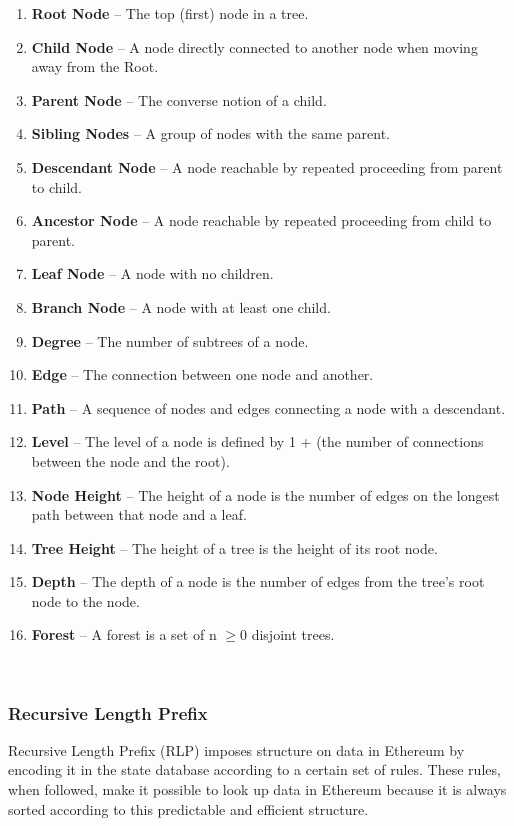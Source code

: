 \documentclass[10pt,a4paper,leqno,bibliography=totoc]{scrartcl}
\newenvironment{alphafootnotes}
{\par\edef\savedfootnotenumber{\number\value{footnote}}
\renewcommand{\thefootnote}{\alph{footnote}}
\setcounter{footnote}{0}}
{\par\setcounter{footnote}{\savedfootnotenumber}}
\begin{document}
\begin{alphafootnotes}
\begin{multicols*}{2}
	\begin{enumerate}[label=\textbf{\alph*})]
		\item \textbf{Root Node} --  The top (first) node in a tree.
		\item \textbf{Child Node} --  A node directly connected to another node when moving away from the Root.
		\item \textbf{Parent Node} --  The converse notion of a child.
		\item \textbf{Sibling Nodes} --  A group of nodes with the same parent.
		\item \textbf{Descendant Node} --  A node reachable by repeated proceeding from parent to child.
		\item \textbf{Ancestor Node} --  A node reachable by repeated proceeding from child to parent.
		\item \textbf{Leaf Node} --  A node with no children.
		\item \textbf{Branch Node} --  A node with at least one child.
		\item \textbf{Degree} --  The number of subtrees of a node.
		\item \textbf{Edge} --  The connection between one node and another.
		\item \textbf{Path} --  A sequence of nodes and edges connecting a node with a descendant.
		\item \textbf{Level} --  The level of a node is defined by 1 + (the number of connections between the node and the root).
		\item \textbf{Node Height} --  The height of a node is the number of edges on the longest path between that node and a leaf.
		\item \textbf{Tree Height} --  The height of a tree is the height of its root node.
		\item \textbf{Depth} --  The depth of a node is the number of edges from the tree's root node to the node.
		\item \textbf{Forest} -- A forest is a set of n $\geq  0$ disjoint trees.
	\end{enumerate}
	\hfill 
	\\

			\subsubsection{Recursive Length Prefix}
				Recursive Length Prefix (RLP) imposes structure on data in Ethereum by encoding it in the state database according to a certain set of rules. These rules, when followed, make it possible to look up data in Ethereum because it is always sorted according to this predictable and efficient structure.
				

\end{multicols*}
\end{alphafootnotes}
\end{document}
